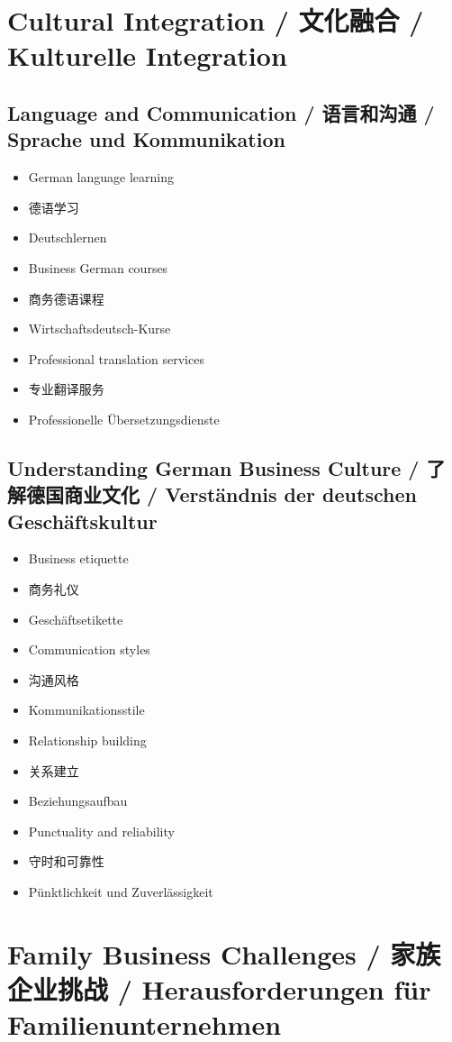 \section{Cultural Integration / 文化融合 / Kulturelle Integration}

\subsection{Language and Communication / 语言和沟通 / Sprache und Kommunikation}
\begin{itemize}
    \item German language learning
    \item 德语学习
    \item Deutschlernen
    \item Business German courses
    \item 商务德语课程
    \item Wirtschaftsdeutsch-Kurse
    \item Professional translation services
    \item 专业翻译服务
    \item Professionelle Übersetzungsdienste
\end{itemize}

\subsection{Understanding German Business Culture / 了解德国商业文化 / Verständnis der deutschen Geschäftskultur}
\begin{itemize}
    \item Business etiquette
    \item 商务礼仪
    \item Geschäftsetikette
    \item Communication styles
    \item 沟通风格
    \item Kommunikationsstile
    \item Relationship building
    \item 关系建立
    \item Beziehungsaufbau
    \item Punctuality and reliability
    \item 守时和可靠性
    \item Pünktlichkeit und Zuverlässigkeit
\end{itemize}

\section{Family Business Challenges / 家族企业挑战 / Herausforderungen für Familienunternehmen}


